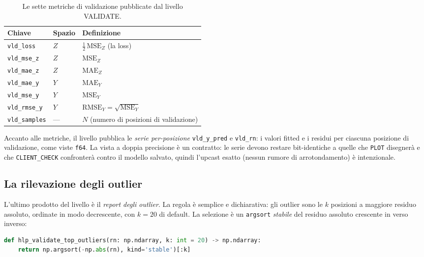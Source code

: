 \begin{table}[htbp]
\centering
\small
\begin{tabular}{lll}
\toprule
Chiave & Spazio & Definizione \\
\midrule
\texttt{vld\_loss}     & $Z$ & $\tfrac{1}{2}\,\mathrm{MSE}_{Z}$ (la loss) \\
\texttt{vld\_mse\_z}   & $Z$ & $\mathrm{MSE}_{Z}$ \\
\texttt{vld\_mae\_z}   & $Z$ & $\mathrm{MAE}_{Z}$ \\
\texttt{vld\_mae\_y}   & $Y$ & $\mathrm{MAE}_{Y}$ \\
\texttt{vld\_mse\_y}   & $Y$ & $\mathrm{MSE}_{Y}$ \\
\texttt{vld\_rmse\_y}  & $Y$ & $\mathrm{RMSE}_{Y} = \sqrt{\mathrm{MSE}_{Y}}$ \\
\texttt{vld\_samples}  & —   & $N$ (numero di posizioni di validazione) \\
\bottomrule
\end{tabular}
\caption{Le sette metriche di validazione pubblicate dal livello VALIDATE.}
\label{tab:vld-metrics}
\end{table}

Accanto alle metriche, il livello pubblica le \emph{serie per-posizione}
\texttt{vld\_y\_pred} e \texttt{vld\_rn}: i valori fitted e i residui per
ciascuna posizione di validazione, come viste \texttt{f64}. La vista a
doppia precisione è un contratto: le serie devono restare bit-identiche a
quelle che \texttt{PLOT} disegnerà e che \texttt{CLIENT\_CHECK} confronterà
contro il modello salvato, quindi l'upcast esatto (nessun rumore di
arrotondamento) è intenzionale.

\subsection{La rilevazione degli outlier}

L'ultimo prodotto del livello è il \emph{report degli outlier}. La regola è
semplice e dichiarativa: gli outlier sono le $k$ posizioni a maggiore
residuo assoluto, ordinate in modo decrescente, con $k = 20$ di default. La
selezione è un \texttt{argsort} \emph{stabile} del residuo assoluto
crescente in verso inverso:

\begin{lstlisting}[language=python, caption={La selezione deterministica dei k outlier.}]
def hlp_validate_top_outliers(rn: np.ndarray, k: int = 20) -> np.ndarray:
    return np.argsort(-np.abs(rn), kind='stable')[:k]
\end{lstlisting}

